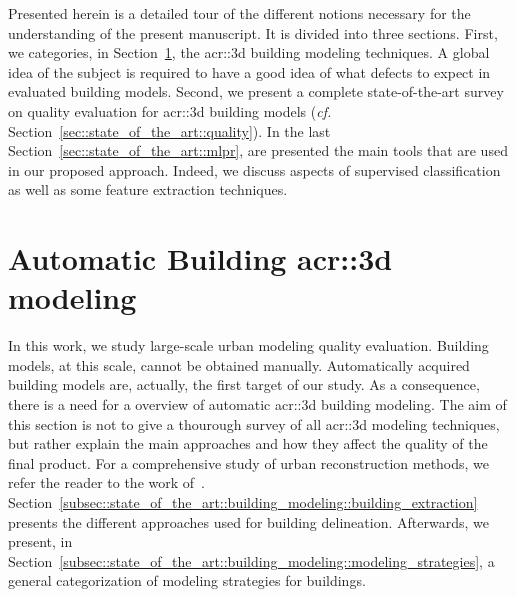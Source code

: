 \minitoc

\vfill

Presented herein is a detailed tour of the different notions necessary for the understanding of the present manuscript.
It is divided into three sections.
First, we categories, in Section~\ref{sec::state_of_the_art::building_modeling}, the \gls{acr::3d} building modeling techniques.
A global idea of the subject is required to have a good idea of what defects to expect in evaluated building models.
Second, we present a complete state-of-the-art survey on quality evaluation for \gls{acr::3d} building models (\textit{cf.} Section~\ref{sec::state_of_the_art::quality}).
In the last Section~\ref{sec::state_of_the_art::mlpr}, are presented the main tools that are used in our proposed approach.
Indeed, we discuss aspects of supervised classification as well as some feature extraction techniques.

\clearpage

\section{Automatic Building \texorpdfstring{\gls*{acr::3d}}{3D} modeling}
    \label{sec::state_of_the_art::building_modeling}
    In this work, we study large-scale urban modeling quality evaluation.
    Building models, at this scale, cannot be obtained manually.
    Automatically acquired building models are, actually, the first target of our study.
    As a consequence, there is a need for a overview of automatic \gls{acr::3d} building modeling.
    The aim of this section is not to give a thourough survey of all \gls{acr::3d} modeling techniques, but rather explain the main approaches and how they affect the quality of the final product.
    For a comprehensive study of urban reconstruction methods, we refer the reader to the work of~\textcite{musialski2013survey}.\\
    Section~\ref{subsec::state_of_the_art::building_modeling::building_extraction} presents the different approaches used for building delineation.
    Afterwards, we present, in Section~\ref{subsec::state_of_the_art::building_modeling::modeling_strategies}, a general categorization of modeling strategies for buildings.

